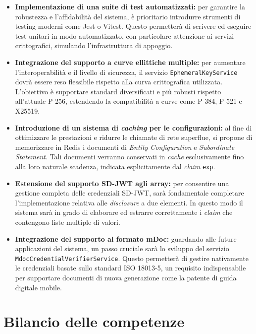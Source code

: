 \begin{itemize}
    \item \textbf{Implementazione di una suite di test automatizzati:} per garantire la robustezza e l'affidabilità del sistema, è prioritario introdurre strumenti di testing moderni come Jest o Vitest. Questo permetterà di scrivere ed eseguire test unitari in modo automatizzato, con particolare attenzione ai servizi crittografici, simulando l'infrastruttura di appoggio.
    
    \item \textbf{Integrazione del supporto a curve ellittiche multiple:} per aumentare l'interoperabilità e il livello di sicurezza, il servizio \texttt{EphemeralKeyService} dovrà essere reso flessibile rispetto alla curva crittografica utilizzata. L'obiettivo è supportare standard diversificati e più robusti rispetto all'attuale P-256, estendendo la compatibilità a curve come P-384, P-521 e X25519.
    
    \item \textbf{Introduzione di un sistema di \textit{caching} per le configurazioni:} al fine di ottimizzare le prestazioni e ridurre le chiamate di rete superflue, si propone di memorizzare in Redis i documenti di \textit{Entity Configuration} e \textit{Subordinate Statement}. Tali documenti verranno conservati in \textit{cache} esclusivamente fino alla loro naturale scadenza, indicata esplicitamente dal \textit{claim} \texttt{exp}.
    
    \item \textbf{Estensione del supporto SD-JWT agli array:} per consentire una gestione completa delle credenziali SD-JWT, sarà fondamentale completare l'implementazione relativa alle \textit{disclosure} a due elementi. In questo modo il sistema sarà in grado di elaborare ed estrarre correttamente i \textit{claim} che contengono liste multiple di valori.
    
    \item \textbf{Integrazione del supporto al formato mDoc\glsfirstoccur{}:} guardando alle future applicazioni del sistema, un passo cruciale sarà lo sviluppo del servizio \texttt{MdocCredentialVerifierService}. Questo permetterà di gestire nativamente le credenziali basate sullo standard ISO 18013-5, un requisito indispensabile per supportare documenti di nuova generazione come la patente di guida digitale mobile.
\end{itemize}

\section{Bilancio delle competenze}

